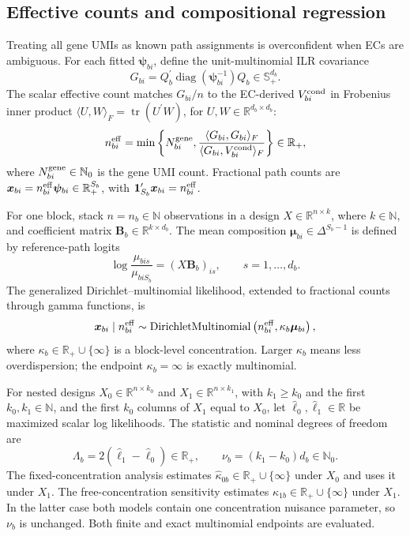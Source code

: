 \documentclass[11pt]{article}
\newcommand{\Beta}{\bm B}
\begin{document}
\subsection*{Effective counts and compositional regression}

Treating all gene UMIs as known path assignments is overconfident when ECs are ambiguous. For each fitted \(\bm\psi_{bi}\), define the unit-multinomial ILR covariance \[
 G_{bi}=Q_b^\prime\operatorname{diag}(\bm\psi_{bi}^{-1})Q_b
 \in\mathbb S_+^{d_b}.
\]
The scalar effective count matches \(G_{bi}/n\) to the EC-derived \(V_{bi}^{\rm cond}\) in Frobenius inner product \(\langle U,W\rangle_F=\operatorname{tr}(U^\prime W)\), for \(U,W\in\mathbb R^{d_b\times d_b}\): \[
 n_{bi}^{\rm eff}=
 \min\left\{N_{bi}^{\rm gene},
 \frac{\langle G_{bi},G_{bi}\rangle_F}
 {\langle G_{bi},V_{bi}^{\rm cond}\rangle_F}\right\}\in\mathbb R_+,
\]
where \(N_{bi}^{\rm gene}\in\mathbb N_0\) is the gene UMI count. Fractional path counts are \(\bm x_{bi}=n_{bi}^{\rm eff}\bm\psi_{bi}\in\mathbb R_+^{S_b}\), with \(\bm1_{S_b}^\prime\bm x_{bi}=n_{bi}^{\rm eff}\).

For one block, stack \(n=n_b\in\mathbb N\) observations in a design \(X\in\mathbb R^{n\times k}\), where \(k\in\mathbb N\), and coefficient matrix \(\Beta_b\in\mathbb R^{k\times d_b}\). The mean composition \(\bm\mu_{bi}\in\Delta^{S_b-1}\) is defined by reference-path logits \[
 \log\frac{\mu_{bis}}{\mu_{biS_b}}
 =(X\Beta_b)_{is},\qquad s=1,\ldots,d_b.
\]
The generalized Dirichlet--multinomial likelihood, extended to fractional counts through gamma functions, is \[
 \bm x_{bi}\mid n_{bi}^{\rm eff}
 \sim\operatorname{DirichletMultinomial}
 \left(n_{bi}^{\rm eff},\kappa_b\bm\mu_{bi}\right),
\]
where \(\kappa_b\in\mathbb R_+\cup\{\infty\}\) is a block-level concentration. Larger \(\kappa_b\) means less overdispersion; the endpoint \(\kappa_b=\infty\) is exactly multinomial.

For nested designs \(X_0\in\mathbb R^{n\times k_0}\) and \(X_1\in\mathbb R^{n\times k_1}\), with \(k_1\geq k_0\) and the first \(k_0,k_1\in\mathbb N\), and the first \(k_0\) columns of \(X_1\) equal to \(X_0\), let \(\widehat\ell_0,\widehat\ell_1\in\mathbb R\) be maximized scalar log likelihoods. The statistic and nominal degrees of freedom are \[
 \Lambda_b=2(\widehat\ell_1-\widehat\ell_0)\in\mathbb R_+,
 \qquad \nu_b=(k_1-k_0)d_b\in\mathbb N_0.
\]
The fixed-concentration analysis estimates \(\widehat\kappa_{0b}\in\mathbb R_+\cup\{\infty\}\) under \(X_0\) and uses it under \(X_1\). The free-concentration sensitivity estimates \(\widehat\kappa_{1b}\in\mathbb R_+\cup\{\infty\}\) under \(X_1\). In the latter case both models contain one concentration nuisance parameter, so \(\nu_b\) is unchanged. Both finite and exact multinomial endpoints are evaluated.
\end{document}

